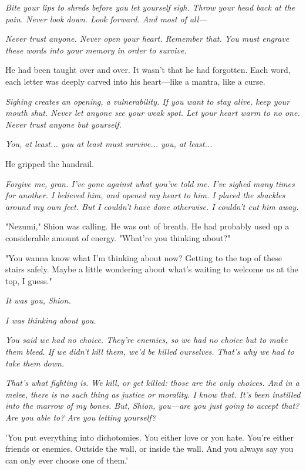 \emph{Bite your lips to shreds before you let yourself sigh. Throw your head
back at the pain. Never look down. Look forward. And most of all---}

\emph{Never trust anyone. Never open your heart. Remember that. You must
engrave these words into your memory in order to survive.}

He had been taught over and over. It wasn't that he had forgotten. Each
word, each letter was deeply carved into his heart---like a mantra, like a
curse.

\emph{Sighing creates an opening, a vulnerability. If you want to stay alive,
keep your mouth shut. Never let anyone see your weak spot. Let your
heart warm to no one. Never trust anyone but yourself.}

\emph{You, at least... you at least must survive... you, at least...}

He gripped the handrail.

\emph{Forgive me, gran. I've gone against what you've told me. I've sighed
many times for another. I believed him, and opened my heart to him. I
placed the shackles around my own feet. But I couldn't have done
otherwise. I couldn't cut him away.}

"Nezumi," Shion was calling. He was out of breath. He had probably used
up a considerable amount of energy. "What're you thinking about?"

"You wanna know what I'm thinking about now? Getting to the top of these
stairs safely. Maybe a little wondering about what's waiting to welcome
us at the top, I guess."

\emph{It was you, Shion.}

\emph{I was thinking about you.}

\emph{You said we had no choice. They're enemies, so we had no choice but to
make them bleed. If we didn't kill them, we'd be killed ourselves.
That's why we had to take them down.}

\emph{That's what fighting is. We kill, or get killed: those are the only
choices. And in a melee, there is no such thing as justice or morality.
I know that. It's been instilled into the marrow of my bones. But,
Shion, you---are you just going to accept that? Are you able to? Are you
letting yourself?}

'You put everything into dichotomies. You either love or you hate.
You're either friends or enemies. Outside the wall, or inside the wall.
And you always say you can only ever choose one of them.'


